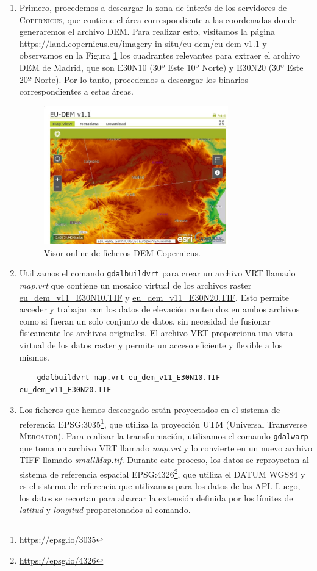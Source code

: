 \documentclass[a4paper, 11pt]{book}
\begin{document}
\begin{enumerate}
    \item Primero, procedemos a descargar la zona de interés de los servidores de \textsc{Copernicus}, que contiene el área correspondiente a las coordenadas donde generaremos el archivo \textsc{DEM}. Para realizar esto, visitamos la página \url{https://land.copernicus.eu/imagery-in-situ/eu-dem/eu-dem-v1.1} y observamos en la Figura \ref{fig:copernicus} los cuadrantes relevantes para extraer el archivo \textsc{DEM} de Madrid, que son \textsc{E30N10} (30º Este 10º Norte) y \textsc{E30N20} (30º Este 20º Norte). Por lo tanto, procedemos a descargar los binarios correspondientes a estas áreas.
\begin{figure}[h]
  \centering
  \includegraphics[width=8cm, keepaspectratio]{img/copernicus.jpg}
  \caption{Visor online de ficheros DEM Copernicus.}
  \label{fig:copernicus}
\end{figure}
    \item Utilizamos el comando \texttt{gdalbuildvrt} para crear un archivo \textsc{VRT} llamado \emph{map.vrt} que contiene un mosaico virtual de los archivos raster \url{eu_dem_v11_E30N10.TIF} y \url{eu_dem_v11_E30N20.TIF}. Esto permite acceder y trabajar con los datos de elevación contenidos en ambos archivos como si fueran un solo conjunto de datos, sin necesidad de fusionar físicamente los archivos originales. El archivo \textsc{VRT} proporciona una vista virtual de los datos raster y permite un acceso eficiente y flexible a los mismos.

    {\scriptsize
    \begin{verbatim}
    gdalbuildvrt map.vrt eu_dem_v11_E30N10.TIF eu_dem_v11_E30N20.TIF
    \end{verbatim}
    }
    
    \item Los ficheros que hemos descargado están proyectados en el sistema de referencia EPSG:3035\footnote{\url{https://epsg.io/3035}}, que utiliza la proyección \textsc{UTM} (Universal Transverse \textsc{Mercator}). Para realizar la transformación, utilizamos el comando \texttt{gdalwarp} que toma un archivo \textsc{VRT} llamado \emph{map.vrt} y lo convierte en un nuevo archivo \textsc{TIFF} llamado \emph{smallMap.tif}. Durante este proceso, los datos se reproyectan al sistema de referencia espacial \textsc{EPSG:4326}\footnote{\url{https://epsg.io/4326}}, que utiliza el \textsc{DATUM WGS84} y es el sistema de referencia que utilizamos para los datos de las API. Luego, los datos se recortan para abarcar la extensión definida por los límites de \emph{latitud} y \emph{longitud} proporcionados al comando.


\end{enumerate}
\end{document}
